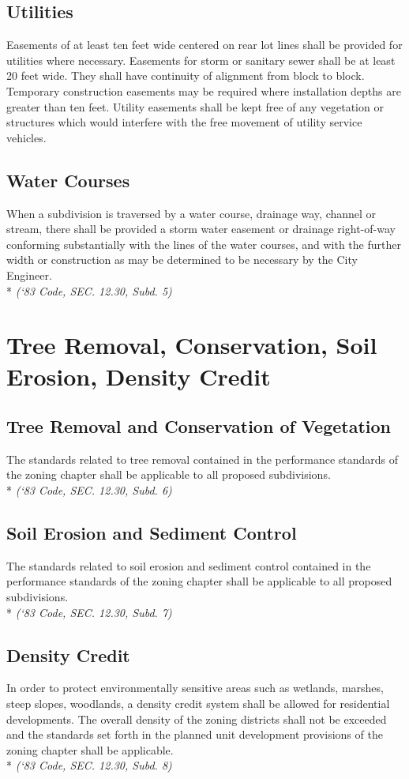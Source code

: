 \subsection{Utilities}
Easements of at least ten feet wide centered on rear lot lines shall be provided for utilities where necessary. Easements for storm or sanitary sewer shall be at least 20 feet wide. They shall have continuity of alignment from block to block. Temporary construction easements may be required where installation depths are greater than ten feet. Utility easements shall be kept free of any vegetation or structures which would interfere with the free movement of utility service vehicles.
\subsection{Water Courses}
When a subdivision is traversed by a water course, drainage way, channel or stream, there shall be provided a storm water easement or drainage right-of-way conforming substantially with the lines of the water courses, and with the further width or construction as may be determined to be necessary by the City Engineer.\\*
\emph{(‘83 Code, SEC. 12.30, Subd. 5)}
\section{Tree Removal, Conservation, Soil Erosion, Density Credit}
\subsection{Tree Removal and Conservation of Vegetation}
The standards related to tree removal contained in the performance standards of the zoning chapter shall be applicable to all proposed subdivisions.\\*
\emph{(‘83 Code, SEC. 12.30, Subd. 6)}
\subsection{Soil Erosion and Sediment Control}
The standards related to soil erosion and sediment control contained in the performance standards of the zoning chapter shall be applicable to all proposed subdivisions.\\*
\emph{(‘83 Code, SEC. 12.30, Subd. 7)}
\subsection{Density Credit}
In order to protect environmentally sensitive areas such as wetlands, marshes, steep slopes, woodlands, a density credit system shall be allowed for residential developments.  The overall density of the zoning districts shall not be exceeded and the standards set forth in the planned unit development provisions of the zoning chapter shall be applicable.\\*
\emph{(‘83 Code, SEC. 12.30, Subd. 8)}

